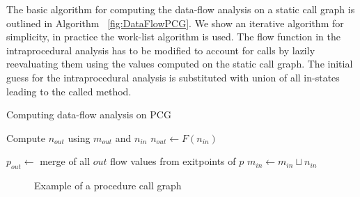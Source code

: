 

The basic algorithm for computing the data-flow analysis on a static call graph is outlined in Algorithm ~\ref{fig:DataFlowPCG}. We show an iterative algorithm for simplicity, in practice the work-list algorithm is used. The flow function in the intraprocedural analysis has to be modified to account for calls by lazily reevaluating them using the values computed on the static call graph. The initial guess for the intraprocedural analysis is substituted with union of all in-states leading to the called method. 

\begin{myalgorithm}
\caption{Computing data-flow analysis on PCG}
\label{fig:DataFlowPCG}
\begin{algorithmic}
\REPEAT
		\STATE {}
		\REPEAT
					\STATE Compute $n_{out}$ using $m_{out}$ and $n_{in}$
				\ELSE
					\STATE $n_{out} \gets F(n_{in})$
				\ENDIF
			\ENDFOR

		\STATE {}
		\STATE $p_{out} \gets$ merge of all $out$ flow values from exitpoints of $p$
		\STATE {}
			\STATE $m_{in} \gets m_{in} \sqcup n_{in}$
		\ENDFOR
	\ENDFOR
{}
\end{algorithmic}
\end{myalgorithm}

\begin{figure}
\begin{center}
\caption{Example of a procedure call graph}
\label{fig:procedureCallGraph}
\end{center}
\end{figure}

